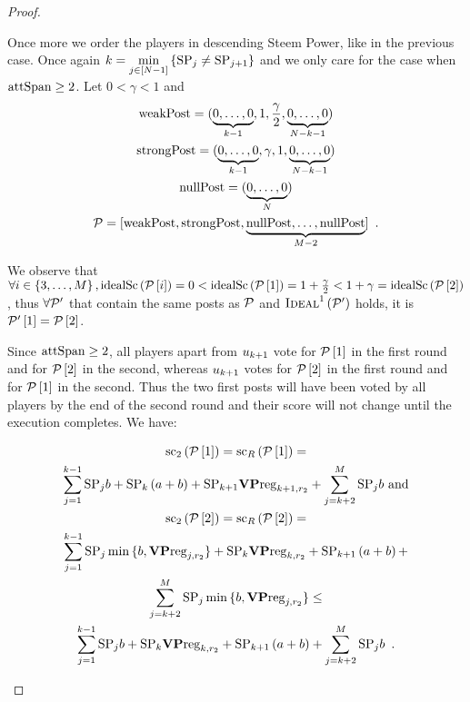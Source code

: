 \begin{proof}
\begin{itemize}
    Once more we order the players in descending Steem Power, like in the
    previous case. Once again $k = \min\limits_{j \in \left[N -
    1\right]}\left\{\mathrm{SP}_j \neq \mathrm{SP}_{j+1}\right\}$ and we only care for the
    case when $\mathrm{attSpan} \geq 2$. Let $0 < \gamma < 1$ and
    \begin{gather*}
      \mathrm{weakPost} = (\underbrace{0, \dots, 0}_{k - 1}, 1, \frac{\gamma}{2},
      \underbrace{0, \dots, 0}_{N - k - 1}) \\
      \mathrm{strongPost} = (\underbrace{0, \dots, 0}_{k - 1}, \gamma, 1, \underbrace{0,
      \dots, 0}_{N - k - 1}) \\
      \mathrm{nullPost} = (\underbrace{0, \dots, 0}_{N}) \\
      \mathcal{P} = [\mathrm{weakPost}, \mathrm{strongPost}, \underbrace{\mathrm{nullPost}, \dots,
      \mathrm{nullPost}}_{M - 2}] \enspace.
    \end{gather*}

    We observe that $\forall i \in \left\{3, \dots, M\right\},
    \mathrm{idealSc}\left(\mathcal{P}\left[i\right]\right) = 0 < \mathrm{idealSc}\left(\mathcal{P}\left[1\right]\right) = 1 +
    \frac{\gamma}{2} < 1 + \gamma = \mathrm{idealSc}\left(\mathcal{P}\left[2\right]\right)$, thus
    $\forall \mathcal{P}'$ that contain the same posts as $\mathcal{P}$ and
    $\textsc{Ideal}^1\left(\mathcal{P}'\right)$ holds, it is
    $\mathcal{P}'\left[1\right] = \mathcal{P}\left[2\right]$.

    Since $\mathrm{attSpan} \geq 2$, all players apart from $u_{k + 1}$ vote for
    $\mathcal{P}\left[1\right]$ in the first round and for
    $\mathcal{P}\left[2\right]$ in the second, whereas $u_{k + 1}$ votes for
    $\mathcal{P}\left[2\right]$ in the first round and for
    $\mathcal{P}\left[1\right]$ in the second. Thus the two first posts will have
    been voted by all players by the end of the second round and their score
    will not change until the execution completes. We have:

    \begin{gather*}
      \mathrm{sc}_2\left(\mathcal{P}\left[1\right]\right) =
      \mathrm{sc}_R\left(\mathcal{P}\left[1\right]\right) = \\
      \sum\limits_{j = 1}^{k-1}\mathrm{SP}_j b + \mathrm{SP}_k \left(a + b\right) +
      \mathrm{SP}_{k+1} \mathrm{\textbf{VP}reg}_{k+1,r_2} + \sum\limits_{j = k +
      2}^{M}\mathrm{SP}_j b \text{ and} \\
      \mathrm{sc}_2\left(\mathcal{P}\left[2\right]\right) =
      \mathrm{sc}_R\left(\mathcal{P}\left[2\right]\right) = \\
      \sum\limits_{j = 1}^{k-1}\mathrm{SP}_j \min{\{b, \mathrm{\textbf{VP}reg}_{j, r_2}\}} +
      \mathrm{SP}_k \mathrm{\textbf{VP}reg}_{k, r_2} + \mathrm{SP}_{k+1} \left(a + b\right) + \\
      \sum\limits_{j = k + 2}^{M}\mathrm{SP}_j \min{\{b, \mathrm{\textbf{VP}reg}_{j,
      r_2}\}} \leq \\
      \sum\limits_{j = 1}^{k-1}\mathrm{SP}_j b + \mathrm{SP}_k \mathrm{\textbf{VP}reg}_{k, r_2} +
      \mathrm{SP}_{k+1} \left(a + b\right) +
      \sum\limits_{j = k + 2}^{M}\mathrm{SP}_j b \enspace.
    \end{gather*}


\end{itemize}
\end{proof}
